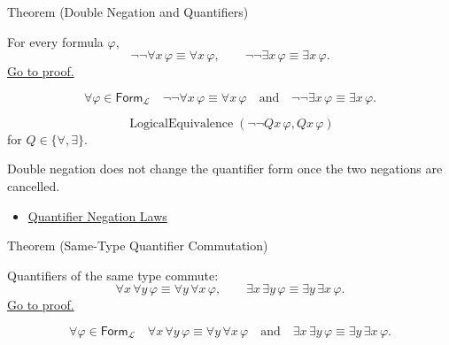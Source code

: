 \begin{theorembox}{Theorem (Double Negation and Quantifiers)}
\begin{theorem}
\label{thm:quantifier-double-negation}
For every formula \(\varphi\),
\[
\neg\neg\forall x\,\varphi \equiv \forall x\,\varphi,
\qquad
\neg\neg\exists x\,\varphi \equiv \exists x\,\varphi.
\]
\hyperref[prf:quantifier-double-negation]{Go to proof.}
\end{theorem}
\end{theorembox}

\begin{remark*}
\[
\forall \varphi\in\mathsf{Form}_{\mathcal L}\quad
\neg\neg\forall x\,\varphi \equiv \forall x\,\varphi
\quad\text{and}\quad
\neg\neg\exists x\,\varphi \equiv \exists x\,\varphi.
\]
\end{remark*}

\begin{remark*}
\[
  \operatorname{LogicalEquivalence}(\neg\neg Qx\,\varphi,Qx\,\varphi)
\] for
\(Q\in\{\forall,\exists\}\).
\end{remark*}

\begin{remark*}[Interpretation]
Double negation does not change the quantifier form once the two negations are
cancelled.
\end{remark*}

\begin{dependencies}
\begin{itemize}
  \item \hyperref[thm:qneg]{Quantifier Negation Laws}
\end{itemize}
\end{dependencies}

\begin{theorembox}{Theorem (Same-Type Quantifier Commutation)}
\begin{theorem}
\label{thm:qcomm}
Quantifiers of the same type commute:
\[
\forall x\,\forall y\,\varphi \equiv \forall y\,\forall x\,\varphi,
\qquad
\exists x\,\exists y\,\varphi \equiv \exists y\,\exists x\,\varphi.
\]
\hyperref[prf:qcomm]{Go to proof.}
\end{theorem}
\end{theorembox}

\begin{remark*}
\[
\forall \varphi\in\mathsf{Form}_{\mathcal L}\quad
\forall x\,\forall y\,\varphi \equiv \forall y\,\forall x\,\varphi
\quad\text{and}\quad
\exists x\,\exists y\,\varphi \equiv \exists y\,\exists x\,\varphi.
\]
\end{remark*}

